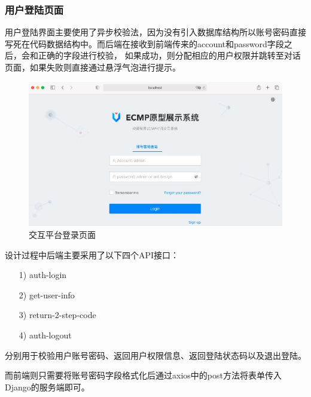 \documentclass[supercite]{HustGraduPaper}
\theoremstyle{definition}
\begin{document}
\subsubsection{用户登陆页面}
用户登陆界面主要使用了异步校验法，因为没有引入数据库结构所以账号密码直接写死在代码数据结构中。而后端在接收到前端传来的account和password字段之后，会和正确的字段进行校验，
如果成功，则分配相应的用户权限并跳转至对话页面，如果失败则直接通过悬浮气泡进行提示。
\begin{figure}[H] %
  \centering %
  \includegraphics[width=1\textwidth]{images/login.jpg} %
  \caption{交互平台登录页面} %
  \label{Fig.login} %
\end{figure}
设计过程中后端主要采用了以下四个API接口：
\begin{itemize}
  \item [1)]auth-login
  \item [2)]get-user-info
  \item [3)]return-2-step-code
  \item [4)]auth-logout
\end{itemize}

分别用于校验用户账号密码、返回用户权限信息、返回登陆状态码以及退出登陆。

而前端则只需要将账号密码字段格式化后通过axios中的post方法将表单传入Django的服务端即可。
\end{document}
